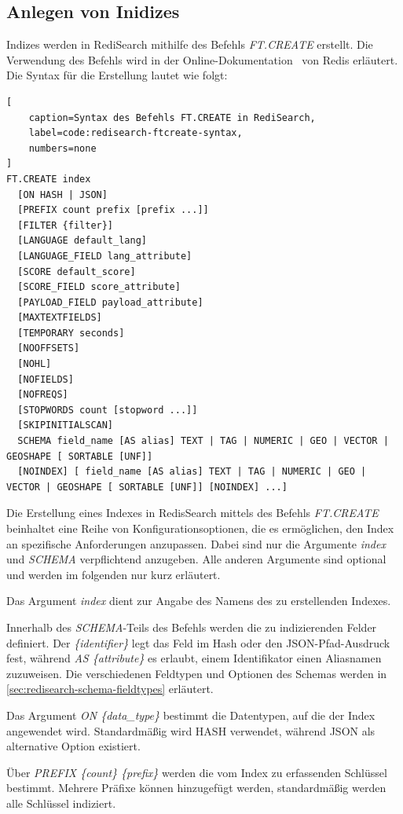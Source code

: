 \subsection{Anlegen von Inidizes}
Indizes werden in RediSearch mithilfe des Befehls \emph{FT.CREATE} erstellt.
Die Verwendung des Befehls wird in der Online-Dokumentation~\cite{redis_ltd_ftcreate_nodate} von Redis erläutert.
Die Syntax für die Erstellung lautet wie folgt:
\begin{lstlisting}[
    caption=Syntax des Befehls FT.CREATE in RediSearch,
    label=code:redisearch-ftcreate-syntax,
    numbers=none
]
FT.CREATE index 
  [ON HASH | JSON] 
  [PREFIX count prefix [prefix ...]] 
  [FILTER {filter}]
  [LANGUAGE default_lang] 
  [LANGUAGE_FIELD lang_attribute] 
  [SCORE default_score] 
  [SCORE_FIELD score_attribute] 
  [PAYLOAD_FIELD payload_attribute] 
  [MAXTEXTFIELDS] 
  [TEMPORARY seconds] 
  [NOOFFSETS] 
  [NOHL] 
  [NOFIELDS] 
  [NOFREQS] 
  [STOPWORDS count [stopword ...]] 
  [SKIPINITIALSCAN]
  SCHEMA field_name [AS alias] TEXT | TAG | NUMERIC | GEO | VECTOR | GEOSHAPE [ SORTABLE [UNF]] 
  [NOINDEX] [ field_name [AS alias] TEXT | TAG | NUMERIC | GEO | VECTOR | GEOSHAPE [ SORTABLE [UNF]] [NOINDEX] ...]
\end{lstlisting}

Die Erstellung eines Indexes in RedisSearch mittels des Befehls \emph{FT.CREATE} beinhaltet eine Reihe von Konfigurationsoptionen, die es ermöglichen, den Index an spezifische Anforderungen anzupassen.
Dabei sind nur die Argumente \emph{index} und \emph{SCHEMA} verpflichtend anzugeben. Alle anderen Argumente sind optional und werden im folgenden nur kurz erläutert.

Das Argument \emph{index} dient zur Angabe des Namens des zu erstellenden Indexes.

Innerhalb des \emph{SCHEMA}-Teils des Befehls werden die zu indizierenden Felder definiert. Der \emph{\{identifier\}} legt das Feld im Hash oder den JSON-Pfad-Ausdruck fest, während \emph{AS \{attribute\}} es erlaubt, einem Identifikator einen Aliasnamen zuzuweisen. Die verschiedenen Feldtypen und Optionen des Schemas werden in \ref{sec:redisearch-schema-fieldtypes} erläutert.


Das Argument \emph{ON \{data\_type\}} bestimmt die Datentypen, auf die der Index angewendet wird. Standardmäßig wird HASH verwendet, während JSON als alternative Option existiert.

Über \emph{PREFIX \{count\} \{prefix\}} werden die vom Index zu erfassenden Schlüssel bestimmt. Mehrere Präfixe können hinzugefügt werden, standardmäßig werden alle Schlüssel indiziert.

